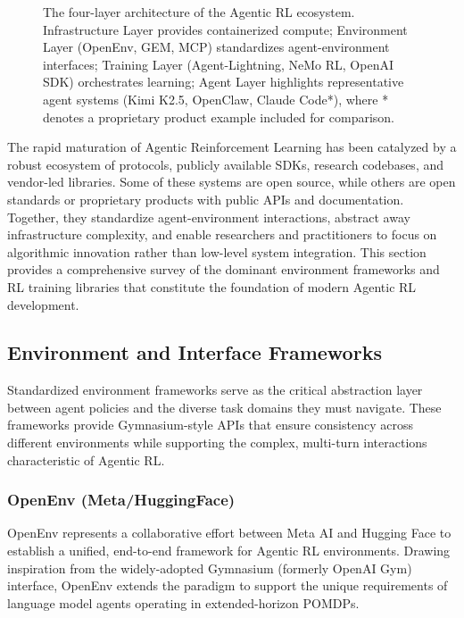 \begin{figure}[tbp]
\begin{tikzpicture}
    \end{tikzpicture}
    \caption{The four-layer architecture of the Agentic RL ecosystem. Infrastructure Layer provides containerized compute; Environment Layer (OpenEnv, GEM, MCP) standardizes agent-environment interfaces; Training Layer (Agent-Lightning, NeMo RL, OpenAI SDK) orchestrates learning; Agent Layer highlights representative agent systems (Kimi K2.5, OpenClaw, Claude Code*), where * denotes a proprietary product example included for comparison.}
    \label{fig:ecosystem}
\end{figure}

The rapid maturation of Agentic Reinforcement Learning has been catalyzed by a robust ecosystem of protocols, publicly available SDKs, research codebases, and vendor-led libraries. Some of these systems are open source, while others are open standards or proprietary products with public APIs and documentation. Together, they standardize agent-environment interactions, abstract away infrastructure complexity, and enable researchers and practitioners to focus on algorithmic innovation rather than low-level system integration. This section provides a comprehensive survey of the dominant environment frameworks and RL training libraries that constitute the foundation of modern Agentic RL development.

\subsection{Environment and Interface Frameworks}

Standardized environment frameworks serve as the critical abstraction layer between agent policies and the diverse task domains they must navigate. These frameworks provide Gymnasium-style APIs that ensure consistency across different environments while supporting the complex, multi-turn interactions characteristic of Agentic RL.

\subsubsection{OpenEnv (Meta/HuggingFace)}

OpenEnv represents a collaborative effort between Meta AI and Hugging Face to establish a unified, end-to-end framework for Agentic RL environments. Drawing inspiration from the widely-adopted Gymnasium (formerly OpenAI Gym) interface, OpenEnv extends the paradigm to support the unique requirements of language model agents operating in extended-horizon POMDPs.

